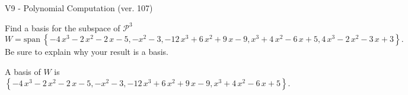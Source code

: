 \begin{exercise}
  \begin{exerciseTitle}V9 - Polynomial Computation (ver. 107)\end{exerciseTitle}
  \begin{exerciseStatement}
    Find a basis for the subspace of \(\mathcal{P}^3\) 
\[W=\mathrm{span}\ \left\{-4 \, x^{3} - 2 \, x^{2} - 2 \, x - 5 , -x^{2} - 3 , -12 \, x^{3} + 6 \, x^{2} + 9 \, x - 9 , x^{3} + 4 \, x^{2} - 6 \, x + 5 , 4 \, x^{3} - 2 \, x^{2} - 3 \, x + 3\right\}.\]
 Be sure to explain why your result is a basis.


  \end{exerciseStatement}
  \begin{exerciseAnswer}
   A basis of \(W\) is  \(\left\{-4 \, x^{3} - 2 \, x^{2} - 2 \, x - 5 , -x^{2} - 3 , -12 \, x^{3} + 6 \, x^{2} + 9 \, x - 9 , x^{3} + 4 \, x^{2} - 6 \, x + 5\right\}\).
  


  \end{exerciseAnswer}
\end{exercise}